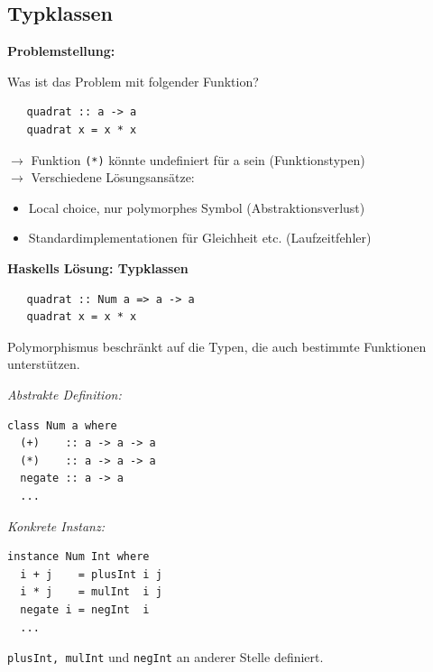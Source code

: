 \documentclass[unknownkeysallowed]{beamer}
\begin{document}
  \subsection{Typklassen}
  \begin{frame}[fragile]
  
  \Large\textbf{Problemstellung:}\bigskip \normalsize

  Was ist das Problem mit folgender Funktion?

  \begin{verbatim}
   quadrat :: a -> a
   quadrat x = x * x
  \end{verbatim}
  
  \bigskip
  \pause
  
  $\to$ Funktion \texttt{(*)} könnte undefiniert für a sein (Funktionstypen) \\ \pause
  $\to$ Verschiedene Lösungsansätze: \pause
  
  \begin{itemize}
  \item \glqq Local choice\grqq , nur polymorphes Symbol (Abstraktionsverlust) \pause
  \item Standardimplementationen für Gleichheit etc. (Laufzeitfehler)
  \end{itemize}
\end{frame}

  
  \begin{frame}[fragile]
  
  \Large\textbf{Haskells Lösung: Typklassen} \normalsize

  \begin{verbatim}
   quadrat :: Num a => a -> a
   quadrat x = x * x
  \end{verbatim}
  
  Polymorphismus beschränkt auf die Typen, die auch bestimmte Funktionen unterstützen.\pause  
  \begin{multicols}{2}
  \emph{Abstrakte Definition:}
  
  \begin{verbatim}
class Num a where
  (+)    :: a -> a -> a
  (*)    :: a -> a -> a
  negate :: a -> a
  ...
  \end{verbatim}

  \vfill \vfill  
  
  \pause
  \columnbreak  
  \emph{Konkrete Instanz:}
  
  \begin{verbatim}
instance Num Int where
  i + j    = plusInt i j
  i * j    = mulInt  i j 
  negate i = negInt  i
  ... 
  \end{verbatim}
  \pause
  \texttt{plusInt, mulInt} und \texttt{negInt} an anderer Stelle definiert.
  \end{multicols}  
  
\end{frame}
\end{document}
